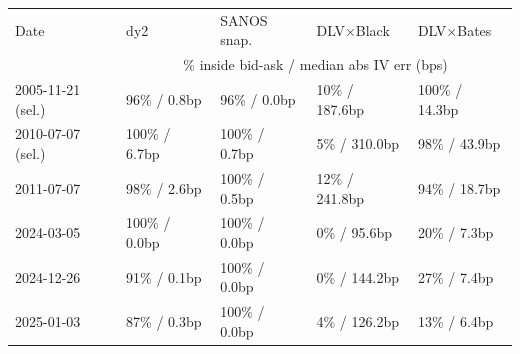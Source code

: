 \begin{tabular}{lllll}
\toprule
Date & dy2 & SANOS snap. & DLV$\times$Black & DLV$\times$Bates \\
& \multicolumn{4}{c}{\% inside bid-ask / median abs IV err (bps)} \\
\midrule
2005-11-21 (sel.) & 96\% / 0.8bp & 96\% / 0.0bp & 10\% / 187.6bp & 100\% / 14.3bp \\
2010-07-07 (sel.) & 100\% / 6.7bp & 100\% / 0.7bp & 5\% / 310.0bp & 98\% / 43.9bp \\
\midrule
2011-07-07 & 98\% / 2.6bp & 100\% / 0.5bp & 12\% / 241.8bp & 94\% / 18.7bp \\
2024-03-05 & 100\% / 0.0bp & 100\% / 0.0bp & 0\% / 95.6bp & 20\% / 7.3bp \\
2024-12-26 & 91\% / 0.1bp & 100\% / 0.0bp & 0\% / 144.2bp & 27\% / 7.4bp \\
2025-01-03 & 87\% / 0.3bp & 100\% / 0.0bp & 4\% / 126.2bp & 13\% / 6.4bp \\
\bottomrule
\end{tabular}
